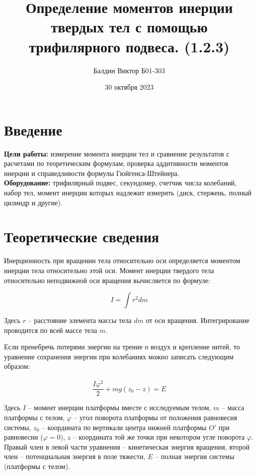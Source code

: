 \documentclass[a4, 12pt]{article}
\title{\textbf{Определение моментов инерции твердых тел с помощью трифилярного подвеса. (1.2.3)}}
\author{Балдин Виктор Б01-303}
\date{30 октября 2023}
\begin{document}
	\maketitle

	\section{Введение}

	\textbf{Цели работы:} измерение момента инерции тел и сравнение результатов с расчетами по теоретическим формулам; проверка аддитивности моментов инерции и справедливости формулы Гюйгенса-Штейнера.\\
	\textbf{Оборудование:} трифилярный подвес, секундомер, счетчик числа колебаний, набор тел, момент инерции которых надлежит измерить (диск, стержень, полный цилиндр и другие).
	\section{Теоретические сведения}

	\par Инерционность при вращении тела относительно оси определяется моментом инерции тела относительно этой оси. Момент инерции твердого тела относительно неподвижной оси вращения вычисляется по формуле:

	\begin{equation}
		I = \int r^2 dm
	\end{equation}

	Здесь $r$ -- расстояние элемента массы тела $dm$ от оси вращения. Интегрирование проводится по всей массе тела $m$.

	Если пренебречь потерями энергии на трение о воздух и крепление нитей, то уравнение сохранения энергии при колебаниях можно записать следующим образом:

	\begin{equation}\label{moment}
		\frac{I \dot{\varphi^2}}{2} + mg(z_0-z) = E
	\end{equation}

	Здесь $I$ -- момент инерции платформы вместе с исследуемым телом, $m$ -- масса платформы с телом, $\varphi$ -- угол поворота платформы от положения равновесия системы, $z_0$ -- координата по вертикали центра нижней платформы $O'$  при равновесии ($\varphi = 0$), $z$ -- координата той же точки при некотором угле поворота $\varphi$. Правый член в левой части уравнения -- кинетическая энергия вращения, второй член -- потенциальная энергия в поле тяжести, $E$ -- полная энергия системы (платформы с телом).
\end{document}
